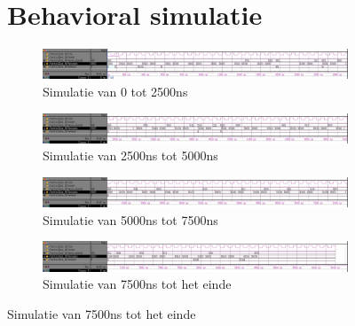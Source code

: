 \begin{figure}[ht!]
\section{Behavioral simulatie}
\begin{figure}[ht!]
\includegraphics[width=\textwidth,height=\textheight,keepaspectratio]{Figuren/Controller/wave0-2_5_inv.jpg}
\caption{Simulatie van 0 tot 2500ns}
\label{fig:sim_beh_0-2_5}
\end{figure}
\begin{figure}[ht!]
\includegraphics[width=\textwidth,height=\textheight,keepaspectratio]{Figuren/Controller/wave2_5-5_inv.jpg}
\caption{Simulatie van 2500ns tot 5000ns}
\label{fig:sim_beh_2_5-5}
\end{figure}
\begin{figure}[ht!]
\includegraphics[width=\textwidth,height=\textheight,keepaspectratio]{Figuren/Controller/wave5-7_5_inv.jpg}
\caption{Simulatie van 5000ns tot 7500ns}
\label{fig:sim_beh_5-7_5}
\end{figure}
\begin{figure}[ht!]
\includegraphics[width=\textwidth,height=\textheight,keepaspectratio]{Figuren/Controller/wave7_5-_inv.jpg}
\caption{Simulatie van 7500ns tot het einde}
\label{fig:sim_beh_7_5-}
\end{figure}
\newpage

\end{figure}
